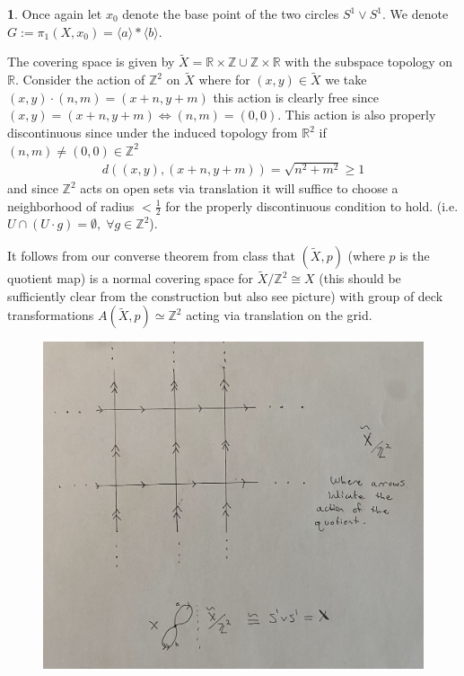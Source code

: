 \documentclass[10.5pt]{article}
\theoremstyle{definition}
\newtheorem{pb}{}
\newcommand{\gen}[1]{\langle #1 \rangle}
\begin{document}
    \newpage
    \begin{pb}
        Once again let \(x_0\) denote the base point of the two circles \(S^1 \vee S^1\). We denote \(G:= \pi_1(X,x_0) = \gen{a}*\gen{b}\).

        The covering space is given by \(\tilde{X} = \mathbb{R} \times \mathbb{Z} \cup \mathbb{Z} \times \mathbb{R}\) with the subspace topology on \(\mathbb{R}\). Consider the action of \(\mathbb{Z}^2\) on \(\tilde{X}\) where for \((x,y) \in \tilde{X}\) we take \((x,y) \cdot(n,m) = (x+n,y+m)\) this action is clearly free since \((x,y) = (x+n,y+m) \iff (n,m) = (0,0)\). This action is also properly discontinuous since under the induced topology from \(\mathbb{R}^2\) if \((n,m) \neq (0,0) \in \mathbb{Z}^2\)
        \begin{align*}
            d\left((x,y), (x+n,y+m) \right) = \sqrt{n^2 + m^2} \geq 1
        \end{align*}
        and since \(\mathbb{Z}^2\) acts on open sets via translation it will suffice to choose a neighborhood of radius \(< \frac12\) for the properly discontinuous condition to hold. (i.e. \(U \cap (U\cdot g) = \emptyset, \; \forall g \in \mathbb{Z}^2\)).

        It follows from our converse theorem from class that \((\tilde{X},p)\) (where \(p\) is the quotient map) is a normal covering space for \(\tilde{X}/\mathbb{Z}^2 \cong X\) (this should be sufficiently clear from the construction but also see picture) with group of deck transformations \(A(\tilde{X},p) \simeq \mathbb{Z}^2\) acting via translation on the grid.

        \begin{figure}[h]
            \centering
            \includegraphics[width = \textwidth]{graphics/Covering space grid.jpg}
        \end{figure}


\end{pb}
\end{document}

